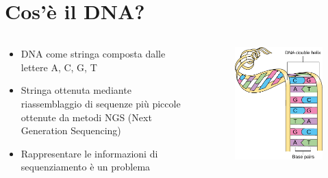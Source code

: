 \documentclass{beamer}
\begin{document}
\section{Cos'è il DNA?}
\begin{frame}{\secname}

	\begin{columns}[onlytextwidth]
		\begin{column}{0.6\textwidth}
			\begin{itemize}
				\item DNA come stringa composta dalle lettere A, C, G, T
		    
				\item Stringa ottenuta mediante riassemblaggio di sequenze più piccole
					ottenute da metodi NGS (Next Generation Sequencing)
		    	   
				\item Rappresentare le informazioni di sequenziamento è un problema
			\end{itemize}
		\end{column}    
		
		\begin{column}{0.4\textwidth}
			\begin{figure}
				\includegraphics[scale=0.45]{dna}
			\end{figure}
		\end{column}
	\end{columns}
\end{frame}
\end{document}
